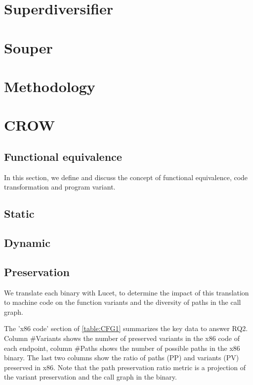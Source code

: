 \section{Superdiversifier}

\section{Souper}

\section{Methodology}

\section{CROW}

\subsection{Functional equivalence}

In this section, we define and discuss the concept of functional equivalence, code transformation and program variant.



\subsection{Static}
\subsection{Dynamic}
\subsection{Preservation}

We translate each \wasm {}binary with Lucet, to determine the impact of this translation to machine code on the function variants and the diversity of paths in the call graph. 

The 'x86 code' section of \autoref{table:CFG1} summarizes the key data to answer RQ2. Column \#Variants shows the number of preserved variants in the x86 code of each endpoint, column \#Paths shows the number of possible paths in the x86 binary. The last two columns show  the ratio of paths (PP) and variants (PV) preserved in x86. 
Note that the path preservation ratio metric is a projection of the variant preservation and the call graph in the binary.

